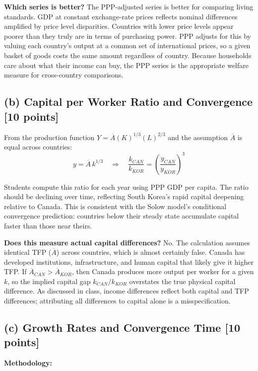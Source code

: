 \documentclass[letterpaper,12pt]{article}
\begin{document}
\textbf{Which series is better?} The PPP-adjusted series is better for comparing living standards. GDP at constant exchange-rate prices reflects nominal differences amplified by price level disparities. Countries with lower price levels appear poorer than they truly are in terms of purchasing power. PPP adjusts for this by valuing each country's output at a common set of international prices, so a given basket of goods costs the same amount regardless of country. Because households care about what their income can buy, the PPP series is the appropriate welfare measure for cross-country comparisons.

\subsection*{(b) Capital per Worker Ratio and Convergence [10 points]}

\noindent From the production function $Y = \overline{A}(K)^{1/3}(L)^{2/3}$ and the assumption $\overline{A}$ is equal across countries:
\[
y = \overline{A}\,k^{1/3} \quad \Longrightarrow \quad \frac{k_{CAN}}{k_{KOR}} = \left(\frac{y_{CAN}}{y_{KOR}}\right)^{3}
\]

Students compute this ratio for each year using PPP GDP per capita. The ratio should be declining over time, reflecting South Korea's rapid capital deepening relative to Canada. This is consistent with the Solow model's conditional convergence prediction: countries below their steady state accumulate capital faster than those near theirs.

\textbf{Does this measure actual capital differences?} No. The calculation assumes identical TFP ($\overline{A}$) across countries, which is almost certainly false. Canada has developed institutions, infrastructure, and human capital that likely give it higher TFP. If $\overline{A}_{CAN} > \overline{A}_{KOR}$, then Canada produces more output per worker for a given $k$, so the implied capital gap $k_{CAN}/k_{KOR}$ overstates the true physical capital difference. As discussed in class, income differences reflect both capital and TFP differences; attributing all differences to capital alone is a misspecification.

\subsection*{(c) Growth Rates and Convergence Time [10 points]}

\noindent\textbf{Methodology:}
\end{document}

